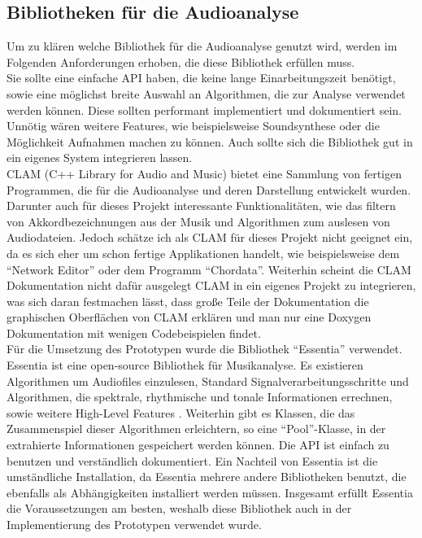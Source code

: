 \documentclass[11pt,a4paper]{article}
\begin{document}
\subsection{Bibliotheken für die Audioanalyse}
Um zu klären welche Bibliothek für die Audioanalyse genutzt wird, werden im Folgenden Anforderungen erhoben, die diese Bibliothek erfüllen muss.\\
Sie sollte eine einfache API haben, die keine lange Einarbeitungszeit benötigt, sowie eine möglichst breite Auswahl an Algorithmen, die zur Analyse verwendet werden können. Diese sollten performant implementiert und dokumentiert sein. Unnötig wären weitere Features, wie beispielsweise Soundsynthese oder die Möglichkeit Aufnahmen machen zu können. Auch sollte sich die Bibliothek gut in ein eigenes System integrieren lassen.\\
CLAM (C++ Library for Audio and Music) bietet eine Sammlung von fertigen Programmen, die für die Audioanalyse und deren Darstellung entwickelt wurden. Darunter auch für dieses Projekt interessante Funktionalitäten, wie das filtern von Akkordbezeichnungen aus der Musik und Algorithmen zum auslesen von Audiodateien. Jedoch schätze ich als CLAM für dieses Projekt nicht geeignet ein, da es sich eher um schon fertige Applikationen handelt, wie beispielsweise dem ``Network Editor'' oder dem Programm ``Chordata''. Weiterhin scheint die CLAM Dokumentation nicht dafür ausgelegt CLAM in ein eigenes Projekt zu integrieren, was sich daran festmachen lässt, dass große Teile der Dokumentation die graphischen Oberflächen von CLAM erklären und man nur eine Doxygen Dokumentation mit wenigen Codebeispielen findet.\\
Für die Umsetzung des Prototypen wurde die Bibliothek ``Essentia'' verwendet. Essentia ist eine open-source Bibliothek für Musikanalyse. Es existieren Algorithmen um Audiofiles einzulesen, Standard Signalverarbeitungsschritte und Algorithmen, die spektrale, rhythmische und tonale Informationen errechnen, sowie weitere High-Level Features \cite{Bogdanov:2013:EOL:2502081.2502229}. Weiterhin gibt es Klassen, die das Zusammenspiel dieser Algorithmen erleichtern, so eine ``Pool''-Klasse, in der extrahierte Informationen gespeichert werden können. Die API ist einfach zu benutzen und verständlich dokumentiert. Ein Nachteil von Essentia ist die umständliche Installation, da Essentia mehrere andere Bibliotheken benutzt, die ebenfalls als Abhängigkeiten installiert werden müssen. Insgesamt erfüllt Essentia die Voraussetzungen am besten, weshalb diese Bibliothek auch in der Implementierung des Prototypen verwendet wurde.
\end{document}
